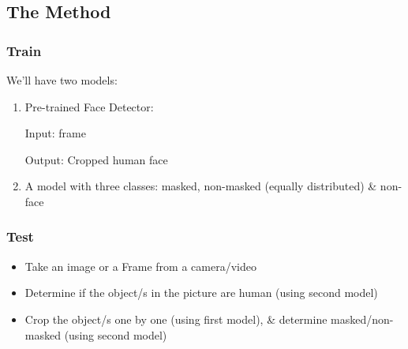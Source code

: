 \subsection{The Method}
\subsubsection{Train}
We'll have two models:
\begin{enumerate}
    \item Pre-trained Face Detector:

        Input: frame

	    Output: Cropped human face
    \item A model with three classes: masked, non-masked (equally distributed) \& non-face
\end{enumerate}


\subsubsection{Test}
\begin{itemize}
    \item Take an image or a Frame from a camera/video
    \item Determine if the object/s in the picture are human (using second model)
    \item Crop the object/s one by one (using first model), \& determine masked/non-masked (using second model)
\end{itemize}


